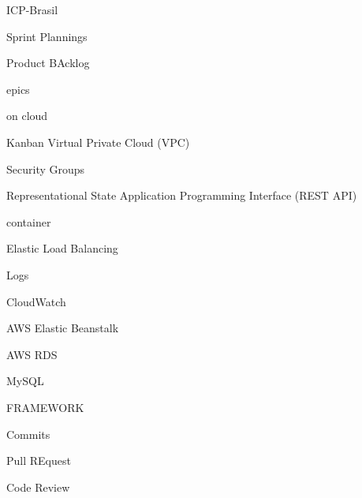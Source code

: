 %
%

ICP-Brasil

Sprint Plannings

Product BAcklog

epics

on cloud

Kanban
Virtual Private Cloud (VPC)

Security Groups


Representational State Application Programming Interface (REST API)

container

Elastic Load Balancing 

Logs

CloudWatch

AWS Elastic Beanstalk

AWS RDS

MySQL

FRAMEWORK

Commits

Pull REquest

Code Review